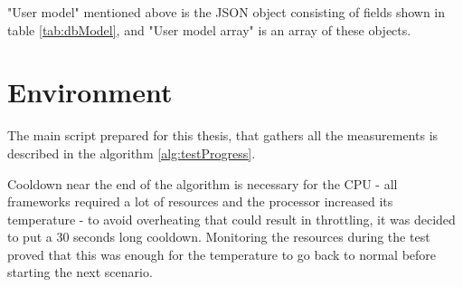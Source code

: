 "User model" mentioned above is the JSON object consisting of fields shown in table \ref{tab:dbModel}, and "User model array" is an array of these objects.

\section{Environment}

The main script prepared for this thesis, that gathers all the measurements is described in the algorithm \ref{alg:testProgress}.



Cooldown near the end of the algorithm is necessary for the CPU - all frameworks required a lot of resources and the processor increased its temperature - to avoid overheating that could result in throttling, it was decided to put a 30 seconds long cooldown. Monitoring the resources during the test proved that this was enough for the temperature to go back to normal before starting the next scenario.
